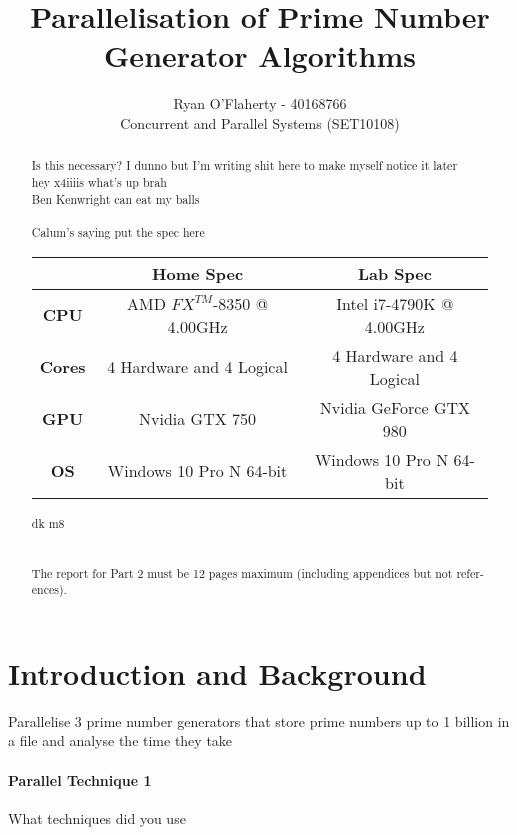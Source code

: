 \documentclass[12pt, conference]{article}
\title{Parallelisation of Prime Number Generator Algorithms}
\author{\vspace{-1.5cm}Ryan O'Flaherty - 40168766 \\ Concurrent and Parallel Systems (SET10108)}
\date{}
\begin{document}
\maketitle
\vspace{-2cm}
\begin{abstract}
Is this necessary? I dunno but I'm writing shit here to make myself notice it later \\ hey x4iiiis what's up brah \\ Ben Kenwright can eat my balls \\\\ Calum's saying put the spec here 

\begin{table}[h]
	\begin{center}
		\begin{tabular}{|c|c|c|}
			\hline
			 & \textbf{Home Spec} & \textbf{Lab Spec}\\
			 \hline
			 \textbf{CPU} & AMD $FX^{TM}$-8350 @ 4.00GHz& Intel i7-4790K @ 4.00GHz\\
			 \hline
			 \textbf{Cores} & 4 Hardware and 4 Logical & 4 Hardware and 4 Logical\\
			 \hline
			\textbf{GPU} & Nvidia GTX 750 & Nvidia GeForce GTX 980\\
			\hline
			\textbf{OS} & Windows 10 Pro N 64-bit & Windows 10 Pro N 64-bit\\
			\hline
		\end{tabular}
	\end{center}
\end{table}

dk m8 \\\\\\The report for Part 2 must be 12 pages maximum (including appendices but not refer- ences).


\end{abstract}

\section{Introduction and Background}
Parallelise 3 prime number generators that store prime numbers up to 1 billion in a file and analyse the time they take

\paragraph{Parallel Technique 1}
What techniques did you use 
\end{document}
